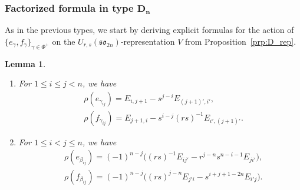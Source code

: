 \documentclass[10pt,a4paper]{amsart}
\numberwithin{equation}{section}
\newtheorem{Lemma}[Theorem]{Lemma}
\newcommand{\sso}{\mathfrak{so}}
\begin{document}
\subsubsection[Factorized formula in type D\_n]{Factorized formula in type $\boldsymbol{D_{n}}$}

As in the previous types, we start by deriving explicit formulas for the action of $\{e_\gamma,f_\gamma\}_{\gamma\in \Phi^+}$ on the $U_{r,s}(\sso_{2n})$-representation $V$ from Proposition~\ref{prp:D_rep}.

\begin{Lemma}\quad\samepage
\begin{enumerate}
\item[$(a)$] For $1 \le i \le j < n$, we have
\begin{displaymath}
\begin{split}
 &\rho(e_{\gamma_{ij}})= E_{i,j + 1} - s^{j - i}E_{(j + 1)',i'},\\
 &\rho(f_{\gamma_{ij}})= E_{j + 1,i} - s^{i - j}(rs)^{-1}E_{i',(j + 1)'}.
\end{split}
\end{displaymath}

\item[$(b)$] For $1 \le i < j \le n$, we have
\begin{displaymath}
\begin{split}
 &\rho(e_{\beta_{ij}})= (-1)^{n - j}\bigl((rs)^{-1}E_{ij'} - r^{j - n}s^{n - i - 1} E_{ji'}\bigr), \\
 &\rho(f_{\beta_{ij}})= (-1)^{n-j}\bigl((rs)^{j - n}E_{j'i} - s^{i + j + 1 - 2n}E_{i'j}\bigr).
\end{split}
\end{displaymath}
\end{enumerate}
\end{Lemma}
\end{document}
